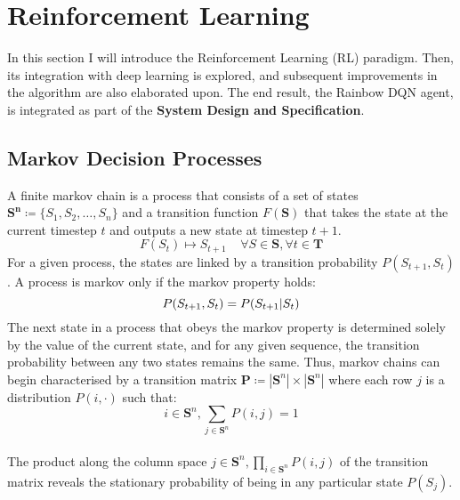 \section{Reinforcement Learning}
In this section I will introduce the Reinforcement Learning (RL)
paradigm. Then, its integration with deep learning is explored, and
subsequent improvements in the algorithm are also elaborated upon.
The end result, the Rainbow DQN agent, is integrated as part of the \textbf{System Design and Specification}.
\subsection{Markov Decision Processes}
A finite markov chain is a process that consists of a set of states
$\mathbf{S^n} \coloneqq \{S_1, S_2, \hdots, S_n\}$ and a transition
function $F(\mathbf{S})$ that takes the state at the current
timestep $t$ and outputs a new state at timestep $t+1$.
\begin{equation}
    F(S_t) \mapsto S_{t+1} \;\;\;\; \forall S \in \mathbf{S}, \forall t\in \mathbf{T}
\end{equation}
For a given process, the states are linked by a transition probability
$P(S_{t+1}, S_t)$. A process is markov only if the markov property holds:
\begin{equation}
    P(S_{t+1}, S_t) = P(S_{t+1} | S_t) \\
\end{equation}
The next state in a process that obeys the markov property is determined
solely by the value of the current state, and for any given sequence, the transition
probability between any two states remains the same. Thus, markov chains can begin
characterised by a transition matrix $\mathbf{P} \coloneqq |\mathbf{S}^n| \times |\mathbf{S}^n|$
where each row $j$ is a distribution $P(i, \cdot)$ such that:
\begin{equation}
    i \in \mathbf{S}^n, \sum_{j \in \mathbf{S}^n} P(i,j) = 1
\end{equation}\\
The product along the column space $j \in \mathbf{S}^n,{\displaystyle \prod_{i \in \mathbf{S}^n}} P(i,j)$ of the transition matrix reveals
the stationary probability of being in any particular state $P(S_j)$.

